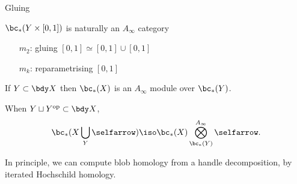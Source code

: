 \documentclass[beamer, compress]{beamer}
\begin{document}
\begin{frame}{Gluing}
\begin{block}{$\bc_*(Y \times [0,1])$ is naturally an $A_\infty$ category}
\begin{itemize}
\item[$m_2$:] gluing $[0,1] \simeq [0,1] \cup [0,1]$
\item[$m_k$:] reparametrising $[0,1]$
\end{itemize}
\end{block}
\begin{block}{}
If $Y \subset \bdy X$ then $\bc_*(X)$ is an $A_\infty$ module over $\bc_*(Y)$.
\end{block}
\begin{thm}
When $Y \sqcup Y^{\text{op}} \subset \bdy X$,
\vspace{-5mm}
\[
	\bc_*(X \bigcup_Y \selfarrow) \iso \bc_*(X) \bigotimes_{\bc_*(Y)}^{A_\infty} \selfarrow.
\]
\end{thm}
In principle, we can compute blob homology from a handle decomposition, by iterated Hochschild homology.
\end{frame}
\end{document}
